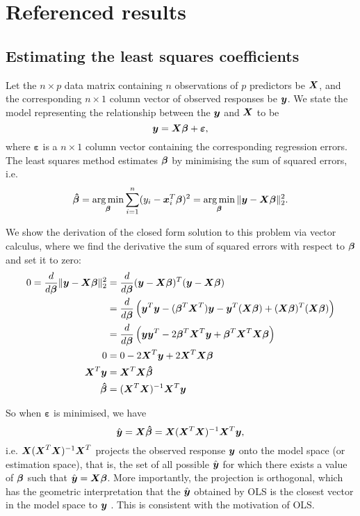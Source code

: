 \documentclass[12pt]{article}
\DeclareMathOperator*{\argmin}{arg\,min}
\newcommand{\gbh}{\hat{\gb}}
\newcommand{\bmgb}{\boldsymbol{\gb}}
\newcommand{\bmge}{\boldsymbol{\varepsilon}}
\newcommand{\bmgbh}{\boldsymbol{\gbh}}
\begin{document}
	\pagebreak
	\section{Referenced results}
	\subsection{Estimating the least squares coefficients\label{sec:append1}}
	Let the $n\times p$ data matrix containing $n$ observations of $p$ predictors be $\boldsymbol{X}$, and the corresponding $n\times 1$ column vector of observed responses be $\boldsymbol{y}$. We state the model representing the relationship between the $\boldsymbol{y}$ and $\boldsymbol{X}$ to be
	$$\bmy=\bmX\bmgb+\bmge,$$
	where $\bmge$ is a $n\times 1$ column vector containing the corresponding regression errors. The least squares method estimates $\bmgb$ by minimising the sum of squared errors, i.e.
	\begin{equation}
		\bmgbh=\argmin_{\bmgb}\sum_{i=1}^{n}(y_i-\bmx_i^T\bmgb)^2=\argmin_{\bmgb}\|\bmy-\bmX\bmgb\|_2^2.
	\end{equation}
	
	We show the derivation of the closed form solution to this problem via vector calculus, where we find the derivative the sum of squared errors with respect to $\bmgb$ and set it to zero:
	 \begin{align*}
	 	0=\frac{d}{d\bmgb}\|\bmy-\bmX\bmgb\|_2^2&=\frac{d}{d\bmgb}(\bmy-\bmX\bmgb)^T(\bmy-\bmX\bmgb)\\
	 	&=\frac{d}{d\bmgb}\lt(\bmy^T\bmy-(\bmgb^T\bmX^T)\bmy-\bmy^T(\bmX\bmgb)+(\bmX\bmgb)^T(\bmX\bmgb)\rt)\\
	 	&=\frac{d}{d\bmgb}\lt(\bmy\bmy^T-2\bmgb^T\bmX^T\bmy+\bmgb^T\bmX^T\bmX\bmgb\rt)\\
	 	0&=0-2\bmX^T\bmy+2\bmX^T\bmX\bmgb\\
	 	\bmX^T\bmy&=\bmX^T\bmX\bmgbh\\
	 	\bmgbh&=(\bmX^T\bmX)^{-1}\bmX^T\bmy
	 \end{align*}
	 
	So when $\bmge$ is minimised, we have
	\begin{equation}
		\hat{\bmy}=\bmX\bmgbh=\bmX(\bmX^T\bmX)^{-1}\bmX^T\bmy,
	\end{equation}
	i.e. $\boldsymbol{X}(\boldsymbol{X}^T\boldsymbol{X})^{-1}\boldsymbol{X}^T$ projects the observed response $\boldsymbol{y}$ onto the model space (or estimation space), that is, the set of all possible $\hat{\boldsymbol{y}}$ for which there exists a value of $\bmgb$ such that $\hat{\bmy}=\bmX\bmgb$. More importantly, the projection is orthogonal, which has the geometric interpretation that the $\hat{\boldsymbol{y}}$ obtained by OLS is the closest vector in the model space to $\boldsymbol{y}$ \cite{Agresti2015}. This is consistent with the motivation of OLS.\\
	
\end{document}
